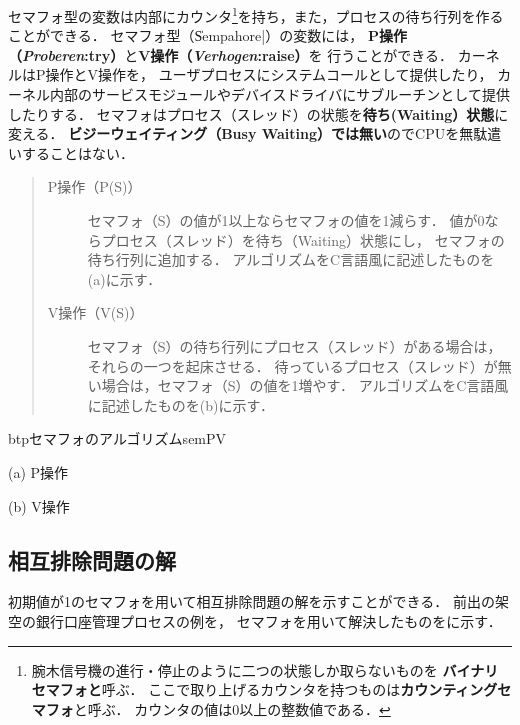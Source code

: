 
セマフォ型の変数は内部にカウンタ\footnote{
腕木信号機の進行・停止のように二つの状態しか取らないものを
{\bf バイナリセマフォと}呼ぶ．
ここで取り上げるカウンタを持つものは{\bf カウンティングセマフォ}と呼ぶ．
カウンタの値は0以上の整数値である．
}を持ち，また，プロセスの待ち行列を作ることができる．
セマフォ型（\|Sempahore|）の変数には，
{\bf P操作（{\it Proberen}:try）}と{\bf V操作（{\it Verhogen}:raise）}を
行うことができる．
カーネルはP操作とV操作を，
ユーザプロセスにシステムコールとして提供したり，
カーネル内部のサービスモジュールやデバイスドライバにサブルーチンとして提供したりする．
セマフォはプロセス（スレッド）の状態を{\bf 待ち(Waiting）状態}に変える．
{\bf ビジーウェイティング（Busy Waiting）では無い}のでCPUを無駄遣いすることはない．

\begin{quote}
\begin{description}
\item[P操作（P(S)）]
セマフォ（S）の値が1以上ならセマフォの値を1減らす．
値が0ならプロセス（スレッド）を待ち（Waiting）状態にし，
セマフォの待ち行列に追加する．
アルゴリズムをC言語風に記述したものを(a)に示す．
\item[V操作（V(S)）] %
セマフォ（S）の待ち行列にプロセス（スレッド）がある場合は，
それらの一つを起床させる．
待っているプロセス（スレッド）が無い場合は，セマフォ（S）の値を1増やす．
アルゴリズムをC言語風に記述したものを(b)に示す．
\end{description}
\end{quote}

\begin{myfig}{btp}{セマフォのアルゴリズム}{semPV}
\small\begin{center}
\begin{minipage}{0.48\columnwidth}

\centerline{(a) P操作}
\end{minipage}\hspace{1em}
\begin{minipage}{0.48\columnwidth}

\centerline{(b) V操作}
\end{minipage}
\end{center}
\end{myfig}

\subsection{相互排除問題の解}
初期値が1のセマフォを用いて相互排除問題の解を示すことができる．
前出の架空の銀行口座管理プロセスの例を，
セマフォを用いて解決したものをに示す．

